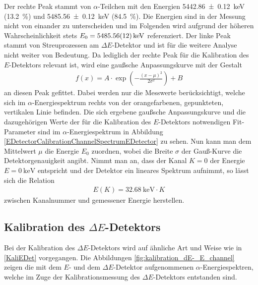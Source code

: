 Der rechte Peak stammt von $\alpha$-Teilchen mit den Energien \SI{5442,86 +- 0,12}{\kilo\electronvolt} (\SI{13,2}{\percent}) und \SI{5485,56 +- 0,12}{\kilo\electronvolt} (\SI{84,5}{\percent}).
Die Energien sind in der Messung nicht von einander zu unterscheiden und im Folgenden wird aufgrund der höheren Wahrscheinlichkeit stets $E_0 = \SI{5485,56 +- 0,12}{\kilo\electronvolt}$ referenziert.
Der linke Peak stammt von Streuprozessen am $\Delta E$-Detektor und ist für die weitere Analyse nicht weiter von Bedeutung.
Da lediglich der rechte Peak für die Kalibration des $E$-Detektors relevant ist, wird eine gaußsche Anpassungskurve mit der Gestalt
\begin{align} \label{Gaussian}
f(x)=A\cdot\exp\left( -\frac{(x-\mu)^2}{2\sigma ^2}\right) + B
\end{align}
an diesen Peak gefittet.
Dabei werden nur die Messwerte berücksichtigt, welche sich im $\alpha$-Energiespektrum rechts von der orangefarbenen, gepunkteten, vertikalen Linie befinden.
Die sich ergebene gaußsche Anpassungskurve und die dazugehörigen Werte der für die Kalibration des $E$-Detektors notwendigen Fit-Parameter sind im $\alpha$-Energiespektrum in Abbildung \ref{EDetectorCalibrationChannelSpectrumEDetector} zu sehen.
Nun kann man dem Mittelwert $\mu$ die Energie $E_{0}$ zuordnen, wobei die Breite $\sigma$ der Gauß-Kurve die Detektorgenauigkeit angibt.
Nimmt man an, dass der Kanal $K=\num{0}$ der Energie $E=\SI{0}{\kilo\electronvolt}$ entspricht und der Detektor ein lineares Spektrum aufnimmt, so lässt sich die Relation 
\begin{align}
E(K) = \SI{32,68}{\kilo\electronvolt} \cdot K
\end{align}
zwischen Kanalnummer und gemessener Energie herstellen.

\subsection{Kalibration des $\Delta E$-Detektors} \label{KalidEDet}

Bei der Kalibration des $\Delta E$-Detektors wird auf ähnliche Art und Weise wie in \cref{KaliEDet} vorgegangen.
Die Abbildungen \ref{fig:kalibration_dE-_E_channel} zeigen die mit dem $E$- und dem $\Delta E$-Detektor aufgenommenen $\alpha$-Energiespektren, welche im Zuge der Kalibrationsmessung des $\Delta E$-Detektors entstanden sind.

